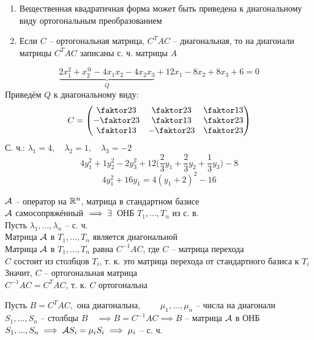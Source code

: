 \begin{theorem}
	\hfill
	\begin{enumerate}
		\item Вещественная квадратичная форма может быть приведена к диагональному виду ортогональным преобразованием

		\item Если $ C $ -- ортогональная матрица, $ C^TAC $ -- диагональная, то на диагонали матрицы $ C^TAC $ записаны с. ч. матрицы $ A $
	\end{enumerate}
\end{theorem}

\begin{eg}
	$$ \underbrace{2x_1^2 + x_2^@ - 4x_1x_2 - 4x_2x_3}_{Q} + 12x_1 - 8x_2 + 8x_3 + 6 = 0 $$
	Приведём $ Q $ к диагональному виду:
	$$ C =
	\begin{pmatrix}
		\faktor23 & \faktor23 & \faktor13 \\
		-\faktor23 & \faktor13 & \faktor23 \\
		\faktor13 & -\faktor23 & \faktor23
	\end{pmatrix} $$
	С. ч.: $ \lambda_1 = 4, \quad \lambda_2 = 1, \quad \lambda_3 = -2 $
	$$ 4y_1^2 + 1y_2^2 - 2y_3^2 + 12 \bigg( \frac23 y_1 + \frac23 y_2 + \frac13 y_3 \bigg) - 8 $$
	$$ 4y_1^2 + 16y_1 = 4(y_1 + 2)^2 - 16 $$
\end{eg}

\begin{eproof}
	\item $ \mathcal{A} $ -- оператор на $ \mathbb{R}^n $, матрица в стандартном базисе  \\
	$ \mathcal{A} $ самосопряжённый $ \implies \exists\, $ ОНБ $ T_1, ..., T_n $ из с. в. \\
	Пусть $ \lambda_1, ..., \lambda_n $ -- с. ч. \\
	Матрица $ \mathcal{A} $ в $ T_1, ..., T_n $ является диагональной \\
	Матрица $ \mathcal{A} $ в $ T_1, ..., T_n $ равна $ C^{-1}AC $, где $ C $ -- матрица перехода \\
	$ C $ состоит из столбцов $ T_i $, т. к. это матрица перехода от стандартного базиса к $ T_i $ \\
	Значит, $ C $ -- ортогональная матрица \\
	$ C^{-1}AC = C^TAC $, т. к. $ C $ ортогональна

	\item Пусть $ B = C^TAC, $ она диагональна, $ \qquad \mu_1, ..., \mu_n $ -- числа на диагонали \\
	$ S_1, ..., S_n $ -- столбцы $ B \quad \implies B = C^{-1}AC \implies B $ -- матрица $ \mathcal{A} $ в ОНБ $ S_1, ..., S_n \implies \mathcal{A}S_i = \mu_iS_i \implies \mu_i $ -- с. ч.
\end{eproof}

